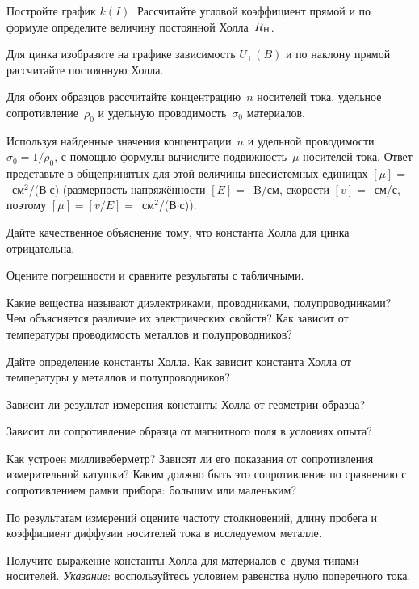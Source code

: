 \begin{lab:task}
\item Постройте график $k(I)$. Рассчитайте угловой коэффициент прямой 
и по формуле  определите величину постоянной Холла~$R_{\rm H}$.

\item Для цинка изобразите на графике зависимость $U_{\perp}(B)$ и по наклону 
прямой рассчитайте постоянную Холла.

\item Для обоих образцов рассчитайте концентрацию~$n$ носителей тока,
удельное сопротивление~$\rho_0$ и удельную проводимость~$\sigma_0$ материалов.

\item Используя найденные значения концентрации~$n$ и удельной проводимости
$\sigma_0=1/\rho_0$, с помощью формулы  вычислите 
подвижность~$\mu$ носителей тока. Ответ представьте в общепринятых для этой величины 
внесистемных единицах $[\mu]=$~см$^2$/(В$\cdot$с)
(размерность напряжённости $[E]=$~B/см, скорости $[v]=$~см/с,
поэтому $[\mu]=[v/E]=$~см$^2$/(В$\cdot$с)).

\item Дайте качественное объяснение тому, что константа Холла для
цинка отрицательна.

\item Оцените погрешности и сравните результаты с табличными.

\end{lab:task}



\begin{lab:questions}

\item Какие вещества называют диэлектриками, проводниками, полупроводниками?
Чем объясняется различие их электрических свойств? Как зависит от температуры
проводимость металлов и полупроводников?

\item Дайте определение константы Холла. Как зависит константа Холла от
температуры у металлов и полупроводников?

\item Зависит ли результат измерения константы Холла от геометрии образца?

\item Зависит ли сопротивление образца от магнитного поля 
в условиях опыта?

\item Как устроен милливеберметр? Зависят ли его показания от сопротивления
измерительной катушки? Каким должно быть это сопротивление по сравнению с
сопротивлением рамки прибора: большим или маленьким?

\item По результатам измерений оцените частоту столкновений,
длину пробега и коэффициент диффузии носителей тока в исследуемом металле.

\item Получите выражение константы Холла для материалов с~двумя типами
носителей. \emph{Указание}: воспользуйтесь условием равенства нулю поперечного тока.

\end{lab:questions}

